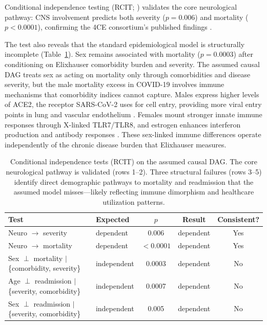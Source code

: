 \documentclass{article}
\begin{document}
Conditional independence testing (RCIT; \citealt{strobl2019rcit}) validates the core neurological pathway: CNS involvement predicts both severity ($p = 0.006$) and mortality ($p < 0.0001$), confirming the 4CE consortium's published findings \cite{four_ce_neuro2021}.

The test also reveals that the standard epidemiological model is structurally incomplete (Table~\ref{tab:rcit}).
Sex remains associated with mortality ($p = 0.0003$) after conditioning on Elixhauser comorbidity burden \cite{elixhauser1998} and severity.
The assumed causal DAG treats sex as acting on mortality only through comorbidities and disease severity, but the male mortality excess in COVID-19 involves immune mechanisms that comorbidity indices cannot capture.
Males express higher levels of ACE2, the receptor SARS-CoV-2 uses for cell entry, providing more viral entry points in lung and vascular endothelium \cite{iadecola2020covid}.
Females mount stronger innate immune responses through X-linked TLR7/TLR8, and estrogen enhances interferon production and antibody responses \cite{takahashi2020sex}.
These sex-linked immune differences operate independently of the chronic disease burden that Elixhauser measures.

\begin{table}[t]
\centering
\caption{Conditional independence tests (RCIT) on the assumed causal DAG. The core neurological pathway is validated (rows 1--2). Three structural failures (rows 3--5) identify direct demographic pathways to mortality and readmission that the assumed model misses---likely reflecting immune dimorphism and healthcare utilization patterns.}
\label{tab:rcit}
\begin{tabular}{llccc}
\toprule
Test & Expected & $p$ & Result & Consistent? \\
\midrule
Neuro $\to$ severity & dependent & 0.006 & dependent & Yes \\
Neuro $\to$ mortality & dependent & $< 0.0001$ & dependent & Yes \\
\midrule
Sex $\perp$ mortality $\mid$ \{comorbidity, severity\} & independent & 0.0003 & dependent & No \\
Age $\perp$ readmission $\mid$ \{severity, comorbidity\} & independent & 0.0007 & dependent & No \\
Sex $\perp$ readmission $\mid$ \{severity, comorbidity\} & independent & 0.005 & dependent & No \\
\bottomrule
\end{tabular}
\end{table}
\end{document}

